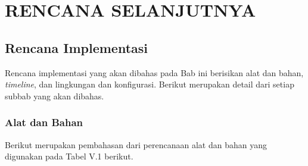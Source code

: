 \chapter{RENCANA SELANJUTNYA}
\label{chap:rencana-selanjutnya}
\section{Rencana Implementasi}

Rencana implementasi yang akan dibahas pada Bab ini berisikan alat dan bahan, 
\textit{timeline}, dan lingkungan dan konfigurasi. Berikut merupakan detail dari 
setiap subbab yang akan dibahas.

\subsection{Alat dan Bahan}

Berikut merupakan pembahasan dari perencanaan alat dan bahan yang digunakan
pada Tabel V.1 berikut.

